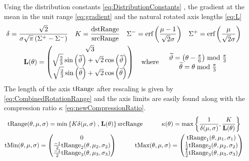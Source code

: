 Using the distribution constants \ref{eq:DistributionConstants} , the gradient at the mean in the unit range \ref{eq:gradient} and the natural rotated axis lengths \ref{eq:L}
\begin{gather*}
 \begin{aligned}
  \delta  &= \frac{ \sqrt{2} }{ \sigma \sqrt{\pi }  \left(\Sigma^+-\Sigma^-\right)} & 
 K & =  \frac{\text{dstRange}}{\text{srcRange}}  & 
 \Sigma^- &= \text{erf}\left(\frac{\mu -1}{\sqrt{2} \sigma }\right) &
 \Sigma^+ &= \text{erf}\left(\frac{\mu }{\sqrt{2} \sigma }\right) 
  \end{aligned} \\
  \mathbf{L}(\theta) =
  \begin{pmatrix}
  \sqrt{3} \\
   \sqrt{\frac{2}{3}} \sin \left(\widetilde{\vartheta}\right) + \sqrt{2} \cos \left(\widetilde{\vartheta}\right) \\  
  \sqrt{\frac{2}{3}} \sin \left(\widetilde{\theta}\right) + \sqrt{2} \cos \left(\widetilde{\theta}\right) 
  \end{pmatrix}
  \quad \text{where}  \quad 
  \begin{array}{c}
  \widetilde{\vartheta} = \left(\theta - \frac{\pi}{6}\right) \bmod \frac{\pi }{3} \\
  \widetilde{\theta} = \theta  \bmod \frac{\pi }{3} 
  \end{array}
\end{gather*}
The length of the axis $\text{tRange}$ after rescaling is given by \ref{eq:CombinedRotationRange} and the axis limits are easily found along with 
the compression ratio $\kappa$ \ref{eq:newCompressionRatio}.
\begin{gather*}
\begin{aligned}
 \text{tRange}(\theta,\mu,\sigma)   & =  \min\left\{K \delta(\mu,\sigma) \right. ,  \left. \mathbf{L}(\theta) \right\}  \text{srcRange} \quad&\quad
 \kappa(\theta) & = \max\left\{ \frac{1}{\delta(\mu,\sigma) }   , \frac{K}{\mathbf{L}(\theta)} \right\}  
 \end{aligned} \\
 \begin{aligned}
  \text{tMin}(\theta,\mu,\sigma)   & =
 \begin{pmatrix}
 0 \\
  \frac{-1 }{2} \text{tRange}_2(\theta,\mu_2,\sigma_2) \\  
  \frac{-1 }{2} \text{tRange}_3(\theta,\mu_3,\sigma_3) \\  
 \end{pmatrix} \quad & \quad
  \text{tMax}(\theta,\mu,\sigma)   & =
 \begin{pmatrix}
  \text{tRange}_1(\theta,\mu_1,\sigma_1)  \\
  \frac{1 }{2} \text{tRange}_2(\theta,\mu_2,\sigma_2)  \\  
  \frac{1 }{2} \text{tRange}_3(\theta,\mu_3,\sigma_3)  \\  
 \end{pmatrix} 
 \end{aligned}
\end{gather*}


